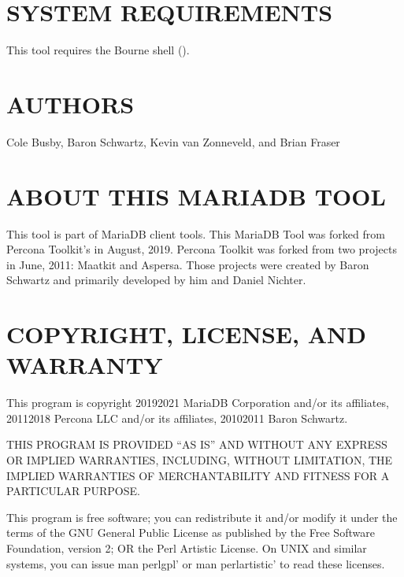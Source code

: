 \documentclass[letterpaper,10pt,english]{sphinxmanual}
\begin{document}
\section{SYSTEM REQUIREMENTS}
\label{\detokenize{mariadb-system-summary:system-requirements}}
\sphinxAtStartPar
This tool requires the Bourne shell ().


\section{AUTHORS}
\label{\detokenize{mariadb-system-summary:authors}}
\sphinxAtStartPar
Cole Busby, Baron Schwartz, Kevin van Zonneveld, and Brian Fraser


\section{ABOUT THIS MARIADB TOOL}
\label{\detokenize{mariadb-system-summary:about-this-mariadb-tool}}
\sphinxAtStartPar
This tool is part of MariaDB client tools. This MariaDB Tool was forked from
Percona Toolkit’s  in August, 2019. Percona Toolkit was
forked from two projects in June, 2011: Maatkit and Aspersa.  Those projects
were created by Baron Schwartz and primarily developed by him and Daniel Nichter.


\section{COPYRIGHT, LICENSE, AND WARRANTY}
\label{\detokenize{mariadb-system-summary:copyright-license-and-warranty}}
\sphinxAtStartPar
This program is copyright 2019\sphinxhyphen{}2021 MariaDB Corporation and/or its affiliates,
2011\sphinxhyphen{}2018 Percona LLC and/or its affiliates, 2010\sphinxhyphen{}2011 Baron Schwartz.

\sphinxAtStartPar
THIS PROGRAM IS PROVIDED “AS IS” AND WITHOUT ANY EXPRESS OR IMPLIED
WARRANTIES, INCLUDING, WITHOUT LIMITATION, THE IMPLIED WARRANTIES OF
MERCHANTABILITY AND FITNESS FOR A PARTICULAR PURPOSE.

\sphinxAtStartPar
This program is free software; you can redistribute it and/or modify it under
the terms of the GNU General Public License as published by the Free Software
Foundation, version 2; OR the Perl Artistic License.  On UNIX and similar
systems, you can issue \textasciigrave{}man perlgpl’ or \textasciigrave{}man perlartistic’ to read these
licenses.
\end{document}
